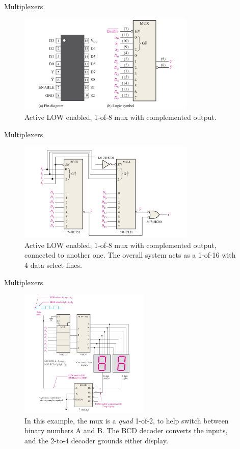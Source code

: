 \documentclass{beamer}
\begin{document}
\begin{frame}{Multiplexers}
\begin{figure}
\centering
\includegraphics[width=0.75\textwidth,trim=3cm 0cm 3cm 0cm,clip=true]{figures/mux5.pdf}
\caption{\label{fig:mux5} Active LOW enabled, 1-of-8 mux with complemented output.}
\end{figure}
\end{frame}

\begin{frame}{Multiplexers}
\begin{figure}
\centering
\includegraphics[width=0.75\textwidth,trim=3cm 0cm 3cm 0cm,clip=true]{figures/mux6.pdf}
\caption{\label{fig:mux6} Active LOW enabled, 1-of-8 mux with complemented output, connected to another one.  The overall system acts as a 1-of-16 with 4 data select lines.}
\end{figure}
\end{frame}

\begin{frame}{Multiplexers}
\begin{figure}
\centering
\includegraphics[width=0.55\textwidth]{figures/mux7.pdf}
\caption{\label{fig:mux7} In this example, the mux is a \textit{quad} 1-of-2, to help switch between binary numbers A and B.  The BCD decoder converts the inputs, and the 2-to-4 decoder grounds either display.}
\end{figure}
\end{frame}
\end{document}
